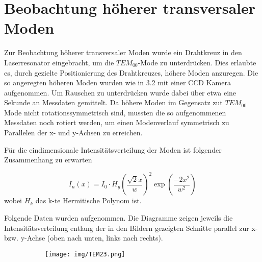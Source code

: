 \documentclass[bigchapter,colorback,accentcolor=tud4b,linedtoc,11pt]{tudreport}
\numberwithin{equation}{subsection}
\begin{document}
\section{Beobachtung höherer transversaler Moden}
Zur Beobachtung höherer transversaler Moden wurde ein Drahtkreuz in den Laserresonator eingebracht, um die $TEM_{00}$-Mode zu unterdrücken. Dies erlaubte es, durch gezielte Positionierung des Drahtkreuzes, höhere Moden anzuregen. Die so angeregten höheren Moden wurden wie in 3.2 mit einer CCD Kamera aufgenommen. Um Rauschen zu unterdrücken wurde dabei über etwa eine Sekunde an Messdaten gemittelt. Da höhere Moden im Gegensatz zut $TEM_{00}$ Mode nicht rotationssymmetrisch sind, mussten die so aufgenommenen Messdaten noch rotiert werden, um einen Modenverlauf symmetrisch zu Parallelen der x- und y-Achsen zu erreichen.

Für die eindimensionale Intensitätsverteilung der Moden ist folgender Zusammenhang zu erwarten
 
$$I_{n}(x) = I_0 \cdot  H_y \left( \frac{\sqrt{2}x}{w} \right)^2 \exp \left( \frac{-2x^2}{w^2} \right)  $$
\cite{TransModeIntensity}
wobei $H_k$ das k-te Hermitische Polynom ist.

Folgende Daten wurden aufgenommen. Die Diagramme zeigen jeweils die Intensitätsverteilung entlang der in den Bildern gezeigten Schnitte parallel zur x- bzw. y-Achse (oben nach unten, links nach rechts).

\begin{figure}[h]
        \centering
        \begin{subfigure}{0.5\textwidth}
                \texttt{[image: img/TEM23.png]}
        \end{subfigure}%
        ~ %
        \begin{subfigure}{0.5\textwidth}
        \end{subfigure}
\end{figure}
\end{document}
